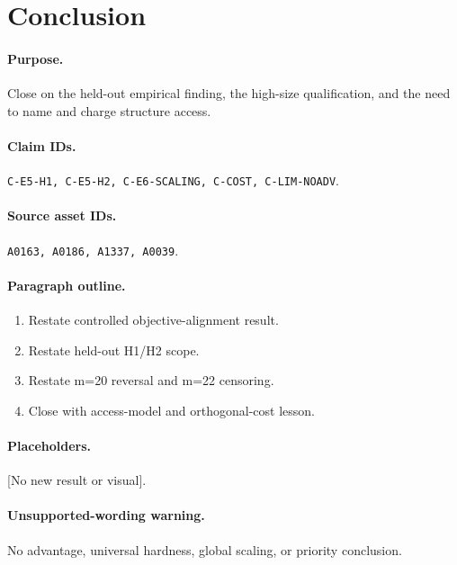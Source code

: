 \section{Conclusion}

\paragraph{Purpose.}
Close on the held-out empirical finding, the high-size qualification, and the
need to name and charge structure access.

\paragraph{Claim IDs.}
\texttt{C-E5-H1, C-E5-H2, C-E6-SCALING, C-COST, C-LIM-NOADV}.

\paragraph{Source asset IDs.}
\texttt{A0163, A0186, A1337, A0039}.

\paragraph{Paragraph outline.}
\begin{enumerate}
  \item Restate controlled objective-alignment result.
  \item Restate held-out H1/H2 scope.
  \item Restate m=20 reversal and m=22 censoring.
  \item Close with access-model and orthogonal-cost lesson.
\end{enumerate}

\paragraph{Placeholders.}
[No new result or visual].

\paragraph{Unsupported-wording warning.}
No advantage, universal hardness, global scaling, or priority conclusion.

